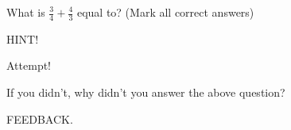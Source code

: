 \documentclass{ximera}
\begin{document}
\begin{problem}

\begin{problem}
    What is $\frac{3}{4} + \frac{4}{3}$ equal to? (Mark all correct answers)
    
    \begin{hint}
    HINT!
    \end{hint}
    
  \begin{selectAll}
      
  \begin{feedback}[attempt]
  Attempt!
  \end{feedback}
  
  \end{selectAll}
  
\end{problem}
\begin{question}
  

  If you didn't, why didn't you answer the above question?
  
  \begin{multipleChoice}
      
      \begin{feedback}[attempt]
      FEEDBACK.
      \end{feedback}
      
  \end{multipleChoice}
  
\end{question}  
\end{problem}
\end{document}
